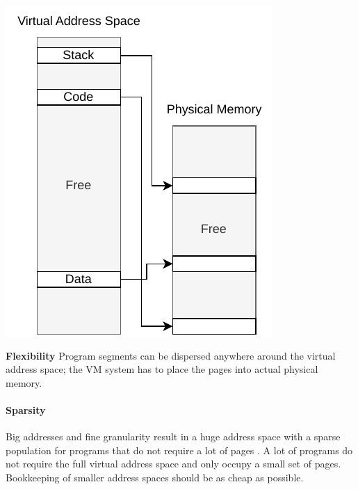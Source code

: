 \begin{marginfigure}
    \includegraphics*[width=0.9\marginparwidth]{figures/fund_flexibility.pdf}
    \caption{\textbf{Flexibility} Program segments can be dispersed anywhere
        around the virtual address space; the VM system has to place
        the pages into actual physical memory.}
\end{marginfigure}

\paragraph{Sparsity} Big addresses and fine granularity result in a huge address
space with a sparse population for programs that do not require a lot of pages
\cite{tanenbaumOS}.
A lot of programs do not require the full virtual address space and only occupy a small set of pages.
Bookkeeping of smaller address spaces should be as cheap as possible.

